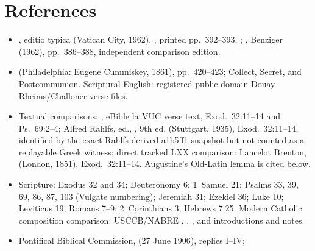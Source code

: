 \section*{References}

{\raggedright\fontsize{7.05}{7.45}\selectfont
\begin{itemize}[itemsep=0em,topsep=0.15em,parsep=0pt]
\item {}, editio typica (Vatican City, 1962),
, printed pp.~392--393,
;
, Benziger  (1962),
pp.~386--388, independent comparison edition.
\item {} (Philadelphia: Eugene Cummiskey, 1861), pp.~420--423; Collect,
Secret, and Postcommunion. Scriptural English: registered public-domain
Douay--Rheims/Challoner verse files.
\item Textual comparisons: ,
eBible latVUC verse text, Exod.~32:11--14 and Ps.~69:2--4; Alfred Rahlfs, ed.,
, 9th ed. (Stuttgart, 1935), Exod.~32:11--14, identified by
the exact Rahlfs-derived a1b5ff1 snapshot but not counted as a replayable Greek
witness; direct tracked LXX comparison: Lancelot Brenton,
 (London, 1851),
Exod.~32:11--14. Augustine's Old-Latin lemma is cited below.
\item Scripture: Exodus 32 and 34; Deuteronomy 6; 1~Samuel 21;
Psalms 33, 39, 69, 86, 87, 103 (Vulgate numbering); Jeremiah
31; Ezekiel 36; Luke 10; Leviticus 19; Romans 7--9; 2~Corinthians 3;
Hebrews 7:25.
Modern Catholic composition comparison: USCCB/NABRE
,
,
, and
introductions and notes.
\item Pontifical Biblical Commission,
(27 June 1906), replies I--IV;

\end{itemize}}
